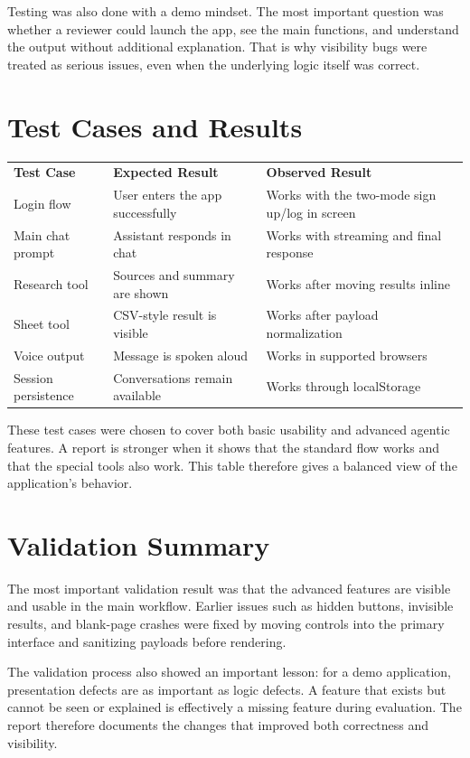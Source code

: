 \documentclass[11pt,oneside]{report}
\begin{document}
Testing was also done with a demo mindset. The most important question was whether a reviewer could launch the app, see the main functions, and understand the output without additional explanation. That is why visibility bugs were treated as serious issues, even when the underlying logic itself was correct.

\section{Test Cases and Results}
\begin{longtable}{p{}p{}p{}}
\textbf{Test Case} & \textbf{Expected Result} & \textbf{Observed Result} \\
Login flow & User enters the app successfully & Works with the two-mode sign up/log in screen \\
Main chat prompt & Assistant responds in chat & Works with streaming and final response \\
Research tool & Sources and summary are shown & Works after moving results inline \\
Sheet tool & CSV-style result is visible & Works after payload normalization \\
Voice output & Message is spoken aloud & Works in supported browsers \\
Session persistence & Conversations remain available & Works through localStorage \\
\end{longtable}

These test cases were chosen to cover both basic usability and advanced agentic features. A report is stronger when it shows that the standard flow works and that the special tools also work. This table therefore gives a balanced view of the application’s behavior.

\section{Validation Summary}
The most important validation result was that the advanced features are visible and usable in the main workflow. Earlier issues such as hidden buttons, invisible results, and blank-page crashes were fixed by moving controls into the primary interface and sanitizing payloads before rendering.

The validation process also showed an important lesson: for a demo application, presentation defects are as important as logic defects. A feature that exists but cannot be seen or explained is effectively a missing feature during evaluation. The report therefore documents the changes that improved both correctness and visibility.
\end{document}
